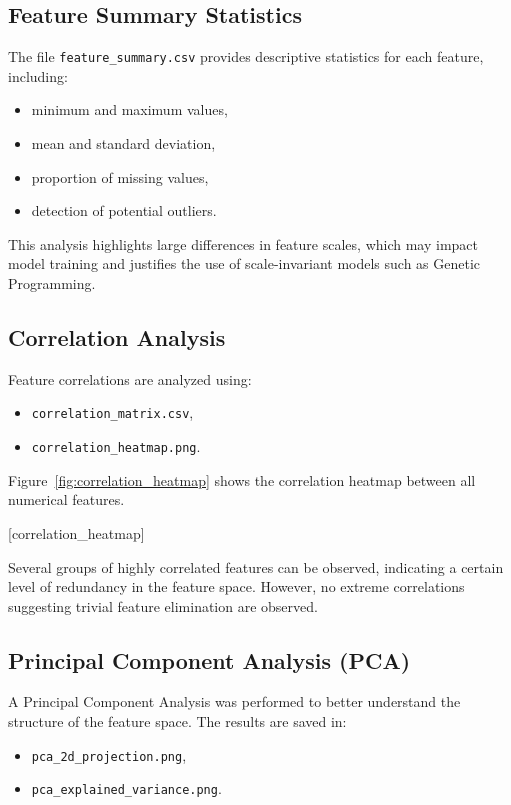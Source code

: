 \documentclass[12pt,a4paper]{article}
\begin{document}
\subsection{Feature Summary Statistics}

The file \texttt{feature\_summary.csv} provides descriptive statistics for each
feature, including:
\begin{itemize}
    \item minimum and maximum values,
    \item mean and standard deviation,
    \item proportion of missing values,
    \item detection of potential outliers.
\end{itemize}

This analysis highlights large differences in feature scales, which may impact
model training and justifies the use of scale-invariant models such as Genetic
Programming.

\subsection{Correlation Analysis}

Feature correlations are analyzed using:
\begin{itemize}
    \item \texttt{correlation\_matrix.csv},
    \item \texttt{correlation\_heatmap.png}.
\end{itemize}

Figure~\ref{fig:correlation_heatmap} shows the correlation heatmap between all
numerical features.

[correlation_heatmap]

Several groups of highly correlated features can be observed, indicating a
certain level of redundancy in the feature space. However, no extreme correlations
suggesting trivial feature elimination are observed.

\subsection{Principal Component Analysis (PCA)}

A Principal Component Analysis was performed to better understand the structure
of the feature space. The results are saved in:
\begin{itemize}
    \item \texttt{pca\_2d\_projection.png},
    \item \texttt{pca\_explained\_variance.png}.
\end{itemize}
\end{document}
